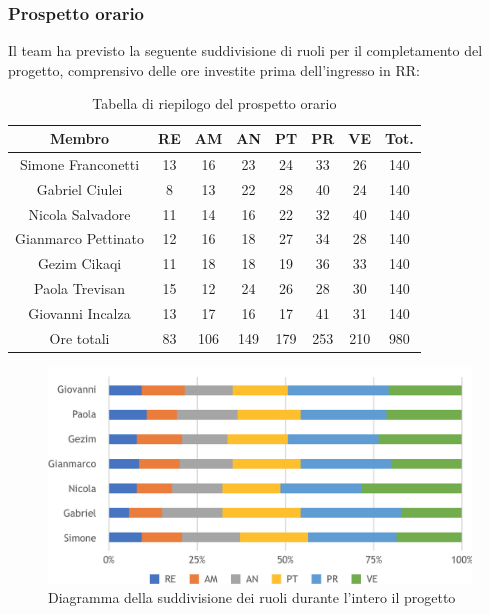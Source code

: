 \subsubsection{Prospetto orario}
Il team ha previsto la seguente suddivisione di ruoli per il completamento del progetto, comprensivo delle ore investite prima dell'ingresso in RR:
\begin{table}[h]
\caption{Tabella di riepilogo del prospetto orario}
\begin{center}
\begin{tabular}{ |c|c|c|c|c|c|c|c|  }
 \hline
 Membro 		& RE 		& AM 		& AN 	& PT 	& PR 	& VE 	& Tot.\\
 \hline\hline
 Simone	Franconetti		& 13 		& 16			& 23 		& 24 		& 33 		& 26 		& 140\\
 Gabriel Ciulei		& 8 			& 13 		& 22 		& 28		& 40 		& 24 		& 140\\
 Nicola	Salvadore		& 11 		& 14 		& 16 		& 22 		& 32 		& 40 		& 140\\
 Gianmarco Pettinato		& 12 		& 16 		& 18 		& 27	 	& 34 		& 28 		& 140\\
 Gezim Cikaqi		& 11 		& 18 		& 18 		& 19 		& 36 		& 33	 	& 140\\
 Paola Trevisan		& 15 		& 12 		& 24 		& 26 		& 28 		& 30 		& 140\\
 Giovanni	Incalza	& 13 		& 17	 		& 16 		& 17 		& 41	 	& 31  		& 140\\
 \hline\hline
 Ore totali		& 83 	& 106		& 149 	& 179 	& 253 	& 210 	& 980\\
  \hline
\end{tabular}
\end{center}
\end{table}
\begin{figure}[h!]
	\includegraphics[width=\textwidth]{res/img/hip3}
	\caption{Diagramma della suddivisione dei ruoli durante l'intero il progetto}
\end{figure}

